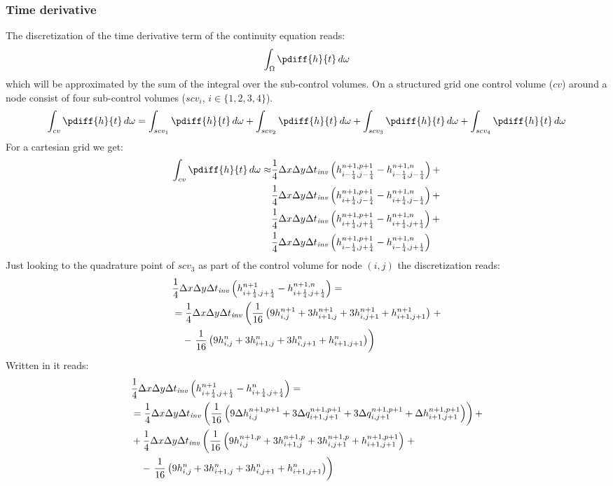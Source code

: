 \subsubsection{Time derivative}
The discretization of the time derivative term of the continuity equation reads:
\begin{align}
    \int_{\Omega} \pdiff{h}{t}\, d\omega
\end{align}
which will be approximated by the sum of the integral over the sub-control volumes.
On a structured grid one control volume ($cv$) around a node consist of four sub-control volumes ($scv_i$, $i\in\{1,2,3,4\}$).
\begin{align}
    \int_{cv} \pdiff{h}{t}\, d\omega =
    \int_{scv_1} \pdiff{h}{t}\, d\omega +
    \int_{scv_2} \pdiff{h}{t}\, d\omega +
    \int_{scv_3} \pdiff{h}{t}\, d\omega +
    \int_{scv_4} \pdiff{h}{t}\, d\omega
\end{align}
For a cartesian grid we get:
\begin{align}
    \int_{cv} \pdiff{h}{t}\, d\omega \approx &
    \quart\Dx\Dy\Dtinv \left( h^{n+1,p+1}_{i-\quart, j-\quart} -  h^{n+1,n}_{i-\quart, j-\quart} \right) +
    \nonumber \\*
    &\quart\Dx\Dy\Dtinv \left( h^{n+1,p+1}_{i+\quart, j-\quart} -  h^{n+1,n}_{i+\quart, j-\quart} \right) +
    \nonumber \\*
    &\quart\Dx\Dy\Dtinv \left( h^{n+1,p+1}_{i+\quart, j+\quart} -  h^{n+1,n}_{i+\quart, j+\quart} \right) +
    \nonumber \\*
    &\quart\Dx\Dy\Dtinv \left( h^{n+1,p+1}_{i-\quart, j+\quart} -  h^{n+1,n}_{i-\quart, j+\quart} \right)
\end{align}
Just looking to the quadrature point of $scv_3$ as part of the control volume for node $(i,j)$ the discretization reads:
\begin{align}
    &\frac{1}{4}\Delta x\Delta y\Delta t_{\it{inv}} \left( h^{n+1}_{i+\frac{1}{4}, j+\frac{1}{4}} -  h^{n+1,n}_{i+\frac{1}{4}, j+\frac{1}{4}} \right) =
    \\*
    &= \frac{1}{4}\Delta x\Delta y\Delta t_{\it{inv}} \left( \frac{1}{16}\left( 9h^{n+1}_{i, j} + 3 h^{n+1}_{i+1,j}  + 3  h^{n+1}_{i, j+1} + h^{n+1}_{i+1, j+1}\right) \right. +
    \\*
    &\quad - \left. \frac{1}{16}\left( 9 h^{n}_{i, j} +  3 h^{n}_{i+1,j}  + 3  h^{n}_{i, j+1} + h^{n}_{i+1, j+1}\right)\right)
\end{align}
Written in \deltaformulation  it reads:
\begin{align}
    &\frac{1}{4}\Delta x\Delta y\Delta t_{\it{inv}} \left( h^{n+1}_{i+\frac{1}{4}, j+\frac{1}{4}} -  h^{n}_{i+\frac{1}{4}, j+\frac{1}{4}} \right) =
    \\*
    &=\frac{1}{4}\Delta x\Delta y\Delta t_{\it{inv}} \left( \frac{1}{16}\left( 9 \Delta h^{n+1,p+1}_{i, j} + 3 \Delta q^{n+1,p+1}_{i+1,j+1}  + 3 \Delta q^{n+1,p+1}_{i, j+1} + \Delta h^{n+1,p+1}_{i+1, j+1}\right) \right) +
    \\*
    & + \frac{1}{4}\Delta x\Delta y\Delta t_{\it{inv}} \left( \frac{1}{16}\left( 9 h^{n+1,p}_{i, j} + 3 h^{n+1,p}_{i+1,j}  + 3 h^{n+1,p}_{i, j+1} + h^{n+1,p+1}_{i+1, j+1}\right) \right. +
    \\*
    &\quad - \left. \frac{1}{16}\left( 9h^{n}_{i, j} +  3 h^{n}_{i+1,j}  + 3  h^{n}_{i, j+1} + h^{n}_{i+1, j+1}\right)\right)
\end{align}

